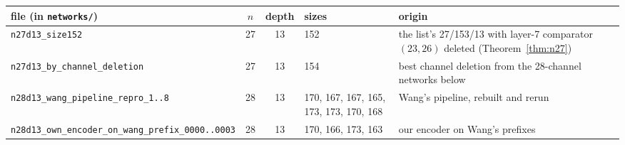 \documentclass[11pt,a4paper]{article}
\theoremstyle{plain}
\theoremstyle{definition}
\theoremstyle{remark}
\begin{document}
\begin{center}\footnotesize
\begin{tabularx}{\textwidth}{@{}p{5.3cm}ccp{2.6cm}L@{}}
\toprule
file (in \texttt{networks/}) & $n$ & depth & sizes & origin \\
\midrule
\texttt{n27d13\_size152} & 27 & 13 & 152 & the list's 27/153/13 with layer-7 comparator $(23,26)$ deleted (Theorem~\ref{thm:n27}) \\
\texttt{n27d13\_by\_channel\_deletion} & 27 & 13 & 154 & best channel deletion from the 28-channel networks below \\
\texttt{n28d13\_wang\_pipeline\_repro\_1..8} & 28 & 13 & 170, 167, 167, 165, 173, 173, 170, 168 & Wang's pipeline, rebuilt and rerun \\
\texttt{n28d13\_own\_encoder\_on\_}\newline\texttt{wang\_prefix\_0000..0003} & 28 & 13 & 170, 166, 173, 163 & our encoder on Wang's prefixes \\
\bottomrule
\end{tabularx}
\end{center}
\end{document}
